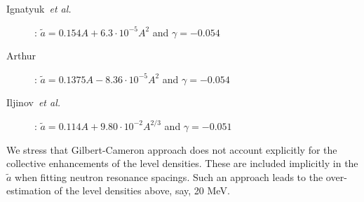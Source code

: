 \documentclass[twocolumn,amsmath,amssymb,10pt,groupedaddress,letter]{revtex4}
\begin{document}
\begin{description}
\item[Ignatyuk~\emph{et al.}~\cite{ignaa}]: $\widetilde{a}=0.154A+6.3\cdot10^{-5}A^{2}$
and $\gamma=-0.054$
\item[Arthur~\cite{arthura}]: $\widetilde{a}=0.1375A-8.36\cdot10^{-5}A^{2}$
and $\gamma=-0.054$
\item[Iljinov~\emph{et al.}~\cite{Mebel}]: $\widetilde{a}=0.114A+9.80\cdot10^{-2}A^{2/3}$
and $\gamma=-0.051$
\end{description}
We stress that Gilbert-Cameron approach does not account explicitly
for the collective enhancements of the level densities.
These are included implicitly in the $\widetilde{a}$ when fitting
neutron resonance spacings. Such an approach leads to the over-estimation
of the level densities above, say, 20 MeV.

\medskip
\end{document}
